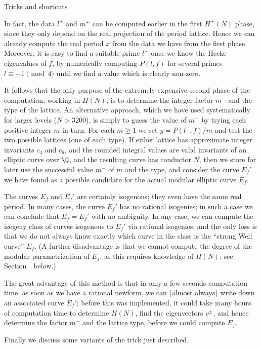 \subhead Tricks and shortcuts \endsubhead

In fact, the data $l^+$ and $m^+$ can be computed earlier in the first
$H^+(N)$ phase, since they only depend on the real projection of the
period lattice.  Hence we can already compute the real period $x$ from
the data we have from the first phase.  Moreover, it is easy to find a
suitable prime $l^-$ once we know the Hecke eigenvalues of $f$, by
numerically computing $P(l,f)$ for several primes $l\equiv-1\pmod4$
until we find a value which is clearly non-zero.

It follows that the only purpose of the extremely expensive second
phase of the computation, working in $H(N)$, is to determine the
integer factor $m^-$ and the type of the lattice.  An alternative
approach, which we have used systematically for larger levels
($N>3200$), is simply to guess the value of $m^-$ by trying each
positive integer $m$ in turn.  For each $m\ge1$ we set $y=P(l^-,f)/m$
and test the two possible lattices (one of each type).  If either
lattice has approximate integer invariants $c_4$ and $c_6$, and the
rounded integral values are valid invariants of an elliptic curve over
$\Q$, and the resulting curve has conductor $N$, then we store for
later use the successful value $m^-$ of $m$ and the type, and consider
the curve $E_f'$ we have found as a possible candidate for the actual
modular elliptic curve $E_f$.

The curves $E_f$ and $E_f'$ are certainly isogenous; they even have
the same real period.  In many cases, the curve $E_f'$ has no rational
isogenies; in such a case we can conclude that $E_f=E_f'$ with no
ambiguity.  In any case, we can compute the isogeny class of curves
isogenous to $E_f'$ via rational isogenies, and the only loss is that
we do not always know exactly which curve in the class is the ``strong
Weil curve'' $E_f$.  (A further disadvantage is that we cannot compute
the degree of the modular parametrization of $E_f$, as this requires
knowledge of $H(N)$: see Section~\Degphi\ below.)

The great advantage of this method is that in only a few seconds
computation time, as soon as we have a rational newform, we can
(almost always) write down an associated curve $E_f'$; before this was
implemented, it could take many hours of computation time to determine
$H(N)$, find the eigenvectors $v^{\pm}$, and hence determine the
factor $m^-$ and the lattice type, before we could compute $E_f$.

Finally we discuss some variants of the trick just described.

